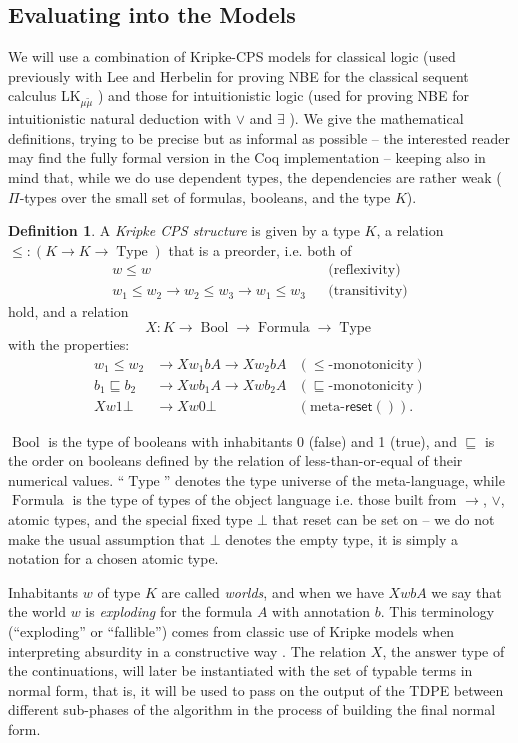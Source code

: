 \documentclass{eptcs}
\newcommand{\reset}[1]{\mathsf{reset}{(#1)}}
\DeclareMathOperator{\Type}{Type}
\DeclareMathOperator{\Bool}{Bool}
\DeclareMathOperator{\Formula}{Formula}
\theoremstyle{definition}
\newtheorem{definition}{Definition}[section]
\theoremstyle{plain}
\theoremstyle{remark}
\begin{document}
\subsection{Evaluating into the Models}\label{subsec:soundness}

We will use a combination of Kripke-CPS models for classical logic (used previously with Lee and Herbelin for proving NBE for the classical sequent calculus LK$_{\mu\tilde\mu}$ \cite{IlikLH2010}) and those for intuitionistic logic (used for proving NBE for intuitionistic natural deduction with $\vee$ and $\exists$ \cite{Ilik2011}). We give the mathematical definitions, trying to be precise but as informal as possible -- the interested reader may find the fully formal version in the Coq implementation -- keeping also in mind that, while we do use dependent types, the dependencies are rather weak ($\Pi$-types over the small set of formulas, booleans, and the type $K$).

\begin{definition}A \emph{Kripke CPS structure} is given by a type $K$, a relation $\le : (K \to K \to \Type)$ that is a preorder, i.e. both of
\begin{align*}
w\le w & &\text{(reflexivity)}\\
w_1\le w_2 \to w_2\le w_3 \to w_1\le w_3 & &\text{(transitivity)}
\end{align*}
hold, and a relation
\[
X : K \to \Bool \to \Formula \to \Type
\]
with the properties:
\begin{align*}
w_1\le w_2 &\to X w_1 b A \to X w_2 b A &(\le\text{-monotonicity})\\
b_1\sqsubseteq b_2 &\to X w b_1 A \to X w b_2 A &(\sqsubseteq\text{-monotonicity})\\
X w 1 \bot &\to X w 0 \bot &(\text{meta-}\reset{}).
\end{align*}

$\Bool$ is the type of booleans with inhabitants 0 (false) and 1 (true), and $\sqsubseteq$ is the order on booleans defined by the relation of less-than-or-equal of their numerical values. ``$\Type$'' denotes the type universe of the meta-language, while $\Formula$ is the type of types of the object language i.e. those built from $\to$, $\vee$, atomic types, and the special fixed type $\bot$ that reset can be set on -- we do not make the usual assumption that $\bot$ denotes the empty type, it is simply a notation for a chosen atomic type.

Inhabitants $w$ of type $K$ are called \emph{worlds}, and when we have $X w b A$ we say that the world $w$ is \emph{exploding} for the formula $A$ with annotation $b$. This terminology (``exploding'' or ``fallible'') comes from classic use of Kripke models when interpreting absurdity in a constructive way \cite{TroelstraVD1}. The relation $X$, the answer type of the continuations, will later be instantiated with the set of typable terms in normal form, that is, it will be used to pass on the output of the TDPE between different sub-phases of the algorithm in the process of building the final normal form.
\end{definition}
\end{document}
